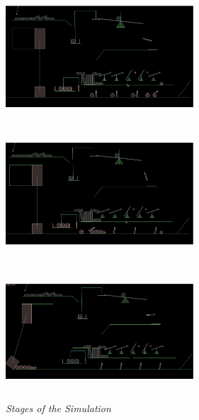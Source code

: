\documentclass[a4paper,11pt]{article}
\begin{document}
\begin{center}
\includegraphics[width=70mm, height=50mm]{state_06.eps}\\
\includegraphics[width=70mm, height=50mm]{state_07.eps}
\includegraphics[width=70mm, height=50mm]{state_08.eps}\\
\emph{Stages of the Simulation}
\end{center}



\end{document}
